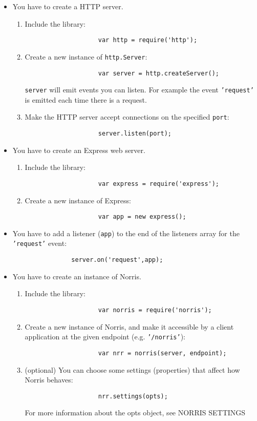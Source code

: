 		\begin{itemize}
			\item You have to create a HTTP server.
			\begin{enumerate}
				\item Include the library:
				\begin{lstlisting}
					var http = require('http');
				\end{lstlisting}
				\item Create a new instance of \texttt{http.Server}:
				\begin{lstlisting}
					var server = http.createServer();
				\end{lstlisting}
				\texttt{server} will emit events you can listen. For example the event \texttt{'request'} is emitted each time there is a request.
				\item Make the HTTP server accept connections on the specified \texttt{port}:
				\begin{lstlisting}
					server.listen(port);
				\end{lstlisting}
			\end{enumerate}
			\item You have to create an Express web server.
			\begin{enumerate}
				\item Include the library:
				\begin{lstlisting}
					var express = require('express');
				\end{lstlisting}
				\item Create a new instance of Express:
				\begin{lstlisting}
					var app = new express();
				\end{lstlisting}
			\end{enumerate}
			\item You have to add a listener (\texttt{app}) to the end of the listeners array for the \texttt{'request'} event:
			\begin{lstlisting}
				server.on('request',app);
			\end{lstlisting}
			\item You have to create an instance of Norris.
			\begin{enumerate}
				\item Include the library:
				\begin{lstlisting}
					var norris = require('norris');
				\end{lstlisting}
				\item Create a new instance of Norris, and make it accessible by a client application at the given endpoint (e.g. \texttt{'/norris'}):
				\begin{lstlisting}
					var nrr = norris(server, endpoint);
				\end{lstlisting}
				\item (optional) You can choose some settings (properties) that affect how Norris behaves:
				\begin{lstlisting}
					nrr.settings(opts);
				\end{lstlisting}
				For more information about the opts object, see NORRIS SETTINGS
			\end{enumerate}
		\end{itemize}
